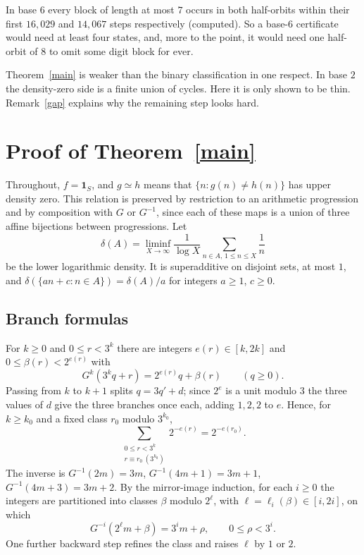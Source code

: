 \documentclass[11pt]{article}
\theoremstyle{remark}
\newcommand{\ld}{\delta}
\begin{document}
In base $6$ every block of length at most $7$ occurs in both half-orbits within
their first $16{,}029$ and $14{,}067$ steps respectively (computed). So a
base-$6$ certificate would need at least four states, and, more to the point, it
would need one half-orbit of $8$ to omit some digit block for ever.

Theorem~\ref{main} is weaker than the binary classification in one respect. In
base $2$ the density-zero side is a finite union of cycles. Here it is only
shown to be thin. Remark~\ref{gap} explains why the remaining step looks hard.

\section{Proof of Theorem~\ref{main}}

Throughout, $f=\mathbf 1_S$, and $g\simeq h$ means that $\{n: g(n)\ne h(n)\}$ has
upper density zero. This relation is preserved by restriction to an arithmetic
progression and by composition with $G$ or $G^{-1}$, since each of these maps is
a union of three affine bijections between progressions. Let
\[
\ld(A)=\liminf_{X\to\infty}\frac1{\log X}\sum_{n\in A,\,1\le n\le X}\frac1n
\]
be the lower logarithmic density. It is superadditive on disjoint sets, at most
$1$, and $\ld(\{an+c:n\in A\})=\ld(A)/a$ for integers $a\ge1$, $c\ge0$.

\subsection{Branch formulas}

For $k\ge0$ and $0\le r<3^k$ there are integers $e(r)\in[k,2k]$ and
$0\le\beta(r)<2^{e(r)}$ with
\begin{equation}\label{fwd}
G^k(3^kq+r)=2^{e(r)}q+\beta(r)\qquad(q\ge0).
\end{equation}
Passing from $k$ to $k+1$ splits $q=3q'+d$; since $2^{e}$ is a unit modulo $3$ the
three values of $d$ give the three branches once each, adding $1,2,2$ to $e$.
Hence, for $k\ge k_0$ and a fixed class $r_0$ modulo $3^{k_0}$,
\begin{equation}\label{weights}
\sum_{\substack{0\le r<3^k\\ r\equiv r_0\ (3^{k_0})}}2^{-e(r)}=2^{-e(r_0)} .
\end{equation}
The inverse is $G^{-1}(2m)=3m$, $G^{-1}(4m+1)=3m+1$, $G^{-1}(4m+3)=3m+2$. By the
mirror-image induction, for each $i\ge0$ the integers are partitioned into
classes $\beta$ modulo $2^{\ell}$, with $\ell=\ell_i(\beta)\in[i,2i]$, on which
\begin{equation}\label{bwd}
G^{-i}(2^{\ell}m+\beta)=3^im+\rho,\qquad 0\le\rho<3^i .
\end{equation}
One further backward step refines the class and raises $\ell$ by $1$ or $2$.
\end{document}
